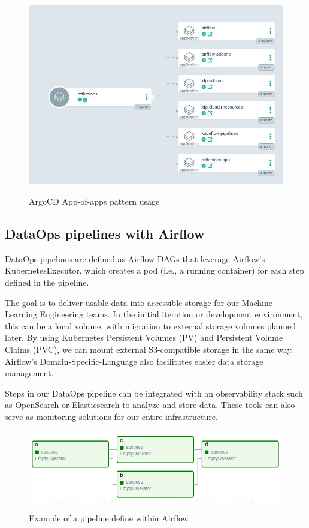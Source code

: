 \begin{figure}[!htbp]
    \centering
    \caption{ArgoCD App-of-apps pattern usage}
    \includegraphics[scale=0.3]{images/project/app-of-apps-pattern}
    \label{fig:app-of-apps-pattern}
\end{figure}

\subsection{DataOps pipelines with Airflow}\label{subsec:dataops-pipelines2}
DataOps pipelines are defined as Airflow DAGs that leverage Airflow’s KubernetesExecutor, which creates a pod (i.e., a running container) for each step defined in the pipeline.

The goal is to deliver usable data into accessible storage for our Machine Learning Engineering teams.
In the initial iteration or development environment, this can be a local volume, with migration to external storage volumes planned later.
By using Kubernetes Persistent Volumes (PV) and Persistent Volume Claims (PVC), we can mount external S3-compatible storage in the same way.
Airflow’s Domain-Specific-Language also facilitates easier data storage management.

Steps in our DataOps pipeline can be integrated with an observability stack such as OpenSearch or Elasticsearch to analyze and store data.
These tools can also serve as monitoring solutions for our entire infrastructure.

\begin{figure}[!htbp]
    \centering
    \caption{Example of a pipeline define within Airflow}
    \includegraphics[scale=0.3]{images/project/data-ops-airflow-dag}
    \label{fig:project-data-ops-airflow-dag}
\end{figure}

